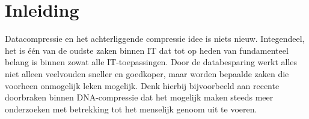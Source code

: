 
\chapter{Inleiding}
\label{ch:inleiding}

Datacompressie en het achterliggende compressie idee is niets nieuw. Integendeel, het is één van de oudste zaken binnen IT dat tot op heden van fundamenteel belang is binnen zowat alle IT-toepassingen. Door de databesparing werkt alles niet alleen veelvouden sneller en goedkoper, maar worden bepaalde zaken die voorheen onmogelijk leken mogelijk. Denk hierbij bijvoorbeeld aan recente doorbraken binnen DNA-compressie dat het mogelijk maken steeds meer onderzoeken met betrekking tot het menselijk genoom uit te voeren.

\section{}
\label{sec:probleemstelling}



\section{}
\label{sec:onderzoeksvragen}


